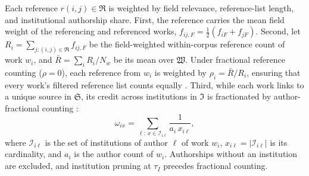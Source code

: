 Each reference $r(i, j) \in \mathfrak{R}$ is weighted by field relevance, reference-list length, and institutional authorship share. First, the reference carries the mean field weight of the referencing and referenced works, $f_{ij,F} = \frac{1}{2}(f_{iF} + f_{jF})$. Second, let $R_i = \sum_{j : (i,j) \in \mathfrak{R}} f_{ij,F}$ be the field-weighted within-corpus reference count of work $w_i$, and $\bar{R} = \sum_{i} R_i / N_w$ be its mean over $\mathfrak{W}$. Under fractional reference counting ($\rho = 0$), each reference from $w_i$ is weighted by $\rho_i = \bar{R} / R_i$, ensuring that every work's filtered reference list counts equally \citep{zittModifyingJournalImpact2008}. Third, while each work links to a unique source in $\mathfrak{S}$, its credit across institutions in $\mathfrak{I}$ is fractionated by author-fractional counting \citep{waltmanFieldnormalizedCitationImpact2015}:
\begin{equation}
    \omega_{ix} = \sum_{\ell :\, x \in \mathcal{I}_{i\ell}} \frac{1}{a_i\, x_{i\ell}},
    \label{eq:inst_weight}
\end{equation}
where $\mathcal{I}_{i\ell}$ is the set of institutions of author $\ell$ of work $w_i$, $x_{i\ell} = |\mathcal{I}_{i\ell}|$ is its cardinality, and $a_i$ is the author count of $w_i$. Authorships without an institution are excluded, and institution pruning at $\tau_I$ precedes fractional counting.


